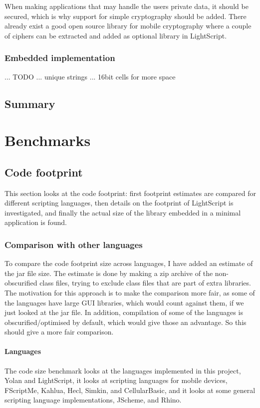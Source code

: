 \documentclass[11pt]{report}
\begin{document}
When making applications that may handle the users private data, it should be secured, which is why support for simple cryptography should be added. There already exist a good open source library for mobile cryptography \cite{bouncycastle} where a couple of ciphers can be extracted and added as optional library in LightScript.

\subsection{Embedded implementation}

... TODO
... unique strings ... 16bit cells for more space

\section{Summary}
\chapter{Benchmarks}
\label{benchmark}

\section{Code footprint}
This section looks at the code footprint: first footprint estimates are compared for different scripting languages, then details on the footprint of LightScript is investigated, and finally the actual size of the library embedded in a minimal application is found.

\subsection{Comparison with other languages}
To compare the code footprint size across languages, I have added an estimate of the jar file size. 
The estimate is done by making a zip archive of the non-obscurified class files,
trying to exclude class files that are part of extra libraries.
The motivation for this approach is to make the comparison more fair, as some of the languages have large GUI libraries,
which would count against them, if we just looked at the jar file. 
In addition, compilation of some of the languages is obscurified/optimised by default,
which would give those an advantage. So this should give a more fair comparison.

\subsubsection{Languages}
\label{codefootprint-languages}
The code size benchmark looks at the languages implemented in this project, Yolan and LightScript, it looks at scripting languages for mobile devices, FScriptMe, Kahlua, Hecl, Simkin, and CellularBasic, and it looks at some general scripting language implementations,  JScheme, and Rhino.
\end{document}
